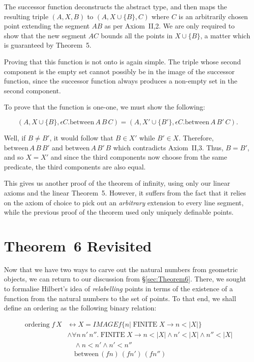 \documentclass{article}
\DeclareMathOperator{\FINITE}{FINITE}
\DeclareMathOperator{\ordering}{ordering}
\newcommand{\between}[3]{\text{between}\,#1\,#2\,#3}
\renewcommand{\implies}{\longrightarrow}
\renewcommand{\iff}{\longleftrightarrow}
\begin{document}
The successor function deconstructs the abstract type, and then maps the resulting triple $(A,X,B)$ to $(A,X \cup \{B\}, C)$ where $C$ is an arbitrarily chosen point extending the segment $AB$ as per Axiom~II,2. We are only required to show that the new segment $AC$ bounds all the points in $X \cup \{B\}$, a matter which is guaranteed by Theorem~5.

Proving that this function is not onto is again simple. The triple whose second component is the empty set cannot possibly be in the image of the successor function, since the successor function always produces a non-empty set in the second component.

To prove that the function is one-one, we must show the following:

\begin{displaymath}
(A,X \cup \{B\}, \epsilon C. \between{A}{B}{C}) = (A,X' \cup \{B'\}, \epsilon C. \between{A}{B'}{C}).
\end{displaymath}

Well, if $B\neq B'$, it would follow that $B\in X'$ while $B'\in X$. Therefore, $\between{A}{B}{B'}$ and $\between{A}{B'}{B}$ which contradicts Axiom~II,3. Thus, \mbox{$B = B'$}, and so $X = X'$ and since the third components now choose from the same predicate, the third components are also equal.

This gives us another proof of the theorem of infinity, using only our linear axioms and the linear Theorem~5. However, it suffers from the fact that it relies on the axiom of choice to pick out an \emph{arbitrary} extension to every line segment, while the previous proof of the theorem used only uniquely definable points.

\section{Theorem~6 Revisited}
Now that we have two ways to carve out the natural numbers from geometric objects, we can return to our discussion from \S\ref{sec:Theorem6}. There, we sought to formalise Hilbert's idea of \emph{relabelling} points in terms of the existence of a function from the natural numbers to the set of points. To that end, we shall define an ordering as the following binary relation:

\begin{align*}
\ordering f\,X &\iff X = IMAGE f \{n \vert \FINITE X \implies n < \left|X\right|\}\\
               &\wedge \forall n\,n'\,n''. \FINITE X \implies n < \left|X\right| \wedge n' < \left|X\right| \wedge n'' < \left|X\right|\\
               &\quad\wedge n < n' \wedge n' < n'' \\
               &\quad\between{(f n)}{(f n')}{(f n'')}
\end{align*}
\end{document}
